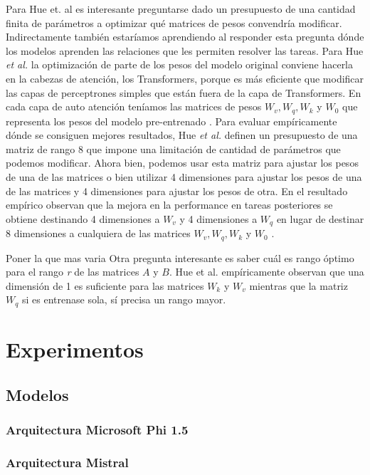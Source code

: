 \documentclass[11pt,a4paper,twoside]{tesis}
\begin{document}
Para Hue et. al es interesante preguntarse dado un presupuesto de una cantidad finita de parámetros a optimizar qué matrices de pesos convendría modificar. Indirectamente también estaríamos aprendiendo al responder esta pregunta dónde los modelos aprenden las relaciones que les permiten resolver las tareas. Para Hue \textit{et al.} la optimización de parte de los pesos del modelo original conviene hacerla en la cabezas de atención, los Transformers, porque es más eficiente que modificar las capas de perceptrones simples que están fuera de la capa de Transformers. En cada capa de auto atención teníamos las matrices de pesos $W_v, W_q, W_k$  y $W_0$ que representa los pesos del modelo pre-entrenado . Para evaluar empíricamente dónde se consiguen mejores resultados, Hue \textit{et al.} definen un presupuesto de una matriz de rango 8 que impone una limitación de cantidad de parámetros que podemos modificar. Ahora bien, podemos usar esta matriz para ajustar los pesos de una de las matrices o bien utilizar 4 dimensiones para ajustar los pesos de una de las matrices y 4 dimensiones para ajustar los pesos de otra. En el resultado empírico observan que la mejora en la performance en tareas posteriores se obtiene destinando 4 dimensiones a $W_v$ y 4 dimensiones a $W_q$ en lugar de destinar 8 dimensiones a cualquiera de las matrices  $W_v, W_q, W_k$  y $W_0$ . 

Poner la que mas varia
Otra pregunta interesante es saber cuál es rango óptimo para el rango \textit{r} de las matrices $A$ y $B$. Hue {et  al.} empíricamente observan que una dimensión de 1 es suficiente para las matrices $W_k$ y $W_v$ mientras que la matriz $W_q$ si es entrenase sola, sí precisa un rango mayor. 

\chapter{Experimentos}

\section{Modelos}
\subsection{Arquitectura Microsoft Phi 1.5}
\subsection{Arquitectura Mistral}
\end{document}
